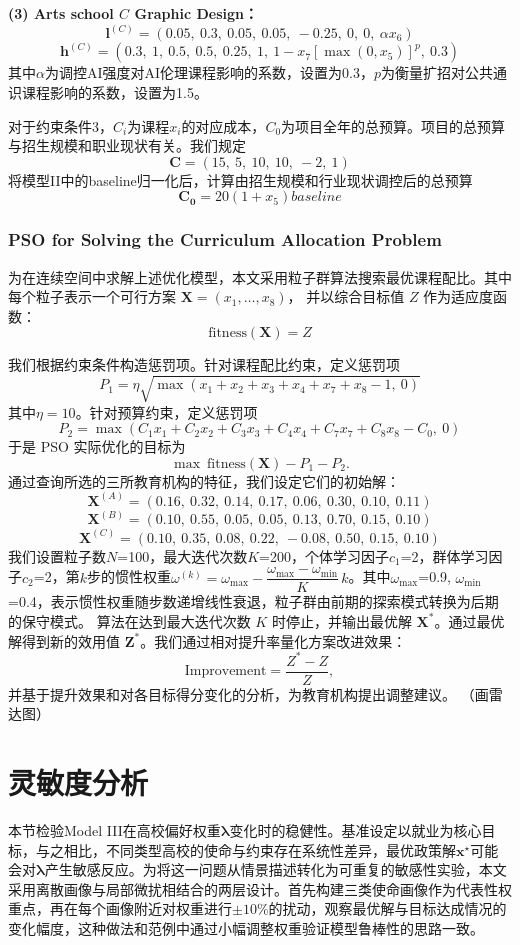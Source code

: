 \documentclass{mcmthesis}
\begin{document}
\medskip
\noindent\textbf{(3) Arts school $C$ Graphic Design：}
\[
\mathbf{l}^{(C)}=
(0.05,\ 0.3,\ 0.05,\ 0.05,\ -0.25,\ 0,\ 0,\ \alpha x_6)
\]
\[
\mathbf{h}^{(C)}=
(0.3,\ 1,\ 0.5,\ 0.5,\ 0.25,\ 1,\ 1-x_7[\max(0,x_5)]^{p},\ 0.3)
\]
其中$\alpha$为调控AI强度对AI伦理课程影响的系数，设置为0.3，$p$为衡量扩招对公共通识课程影响的系数，设置为1.5。

\noindent 对于约束条件3，$C_i$为课程$x_i$的对应成本，$C_0$为项目全年的总预算。项目的总预算与招生规模和职业现状有关。我们规定
\[
\mathbf{C}=
(15,\ 5,\ 10,\ 10,\ -2,\ 1)
\]
将模型II中的baseline归一化后，计算由招生规模和行业现状调控后的总预算
\[
\mathbf{C_0}=
20(1+x_5)baseline
\]

\subsubsection{PSO for Solving the Curriculum Allocation Problem}
\noindent 为在连续空间中求解上述优化模型，本文采用粒子群算法搜索最优课程配比。其中每个粒子表示一个可行方案
$\mathbf{X}=(x_1,\dots,x_8)$，
并以综合目标值 $Z$ 作为适应度函数：
\[
\mathrm{fitness}(\mathbf{X})=Z
\]

\noindent 我们根据约束条件构造惩罚项。针对课程配比约束，定义惩罚项
\[
P_1=\eta\sqrt{\max\!\left(x_1+x_2+x_3+x_4+x_7+x_8-1,\ 0\right)}
\]
其中$\eta=10$。针对预算约束，定义惩罚项
\[
P_2=\max\!\left(C_1x_1+C_2x_2+C_3x_3+C_4x_4+C_7x_7+C_8x_8-C_0,\ 0\right)
\]
于是 PSO 实际优化的目标为
\[
\max \ \mathrm{fitness}(\mathbf{X})-P_1-P_2.
\]
通过查询所选的三所教育机构的特征，我们设定它们的初始解：
\[
\mathbf{X}^{(A)}=
(0.16,\ 0.32,\ 0.14,\ 0.17,\ 0.06,\ 0.30,\ 0.10,\ 0.11)
\]
\[
\mathbf{X}^{(B)}=
(0.10,\ 0.55,\ 0.05,\ 0.05,\ 0.13,\ 0.70,\ 0.15,\ 0.10)
\]
\[
\mathbf{X}^{(C)}=
(0.10,\ 0.35,\ 0.08,\ 0.22,\ -0.08,\ 0.50,\ 0.15,\ 0.10)
\]
\noindent 我们设置粒子数$N$=100，最大迭代次数$K$=200，个体学习因子$c_1$=2，群体学习因子$c_2$=2，第$k$步的惯性权重$\omega^{(k)}=\omega_{\max}-\dfrac{\omega_{\max}-\omega_{\min}}{K}\,k$。其中$\omega_{\max}$=0.9, $\omega_{\min}$=0.4，表示惯性权重随步数递增线性衰退，粒子群由前期的探索模式转换为后期的保守模式。
算法在达到最大迭代次数 $K$ 时停止，并输出最优解 $\mathbf{X}^\ast$。通过最优解得到新的效用值 $\mathbf{Z}^\ast$。我们通过相对提升率量化方案改进效果：
\[
\mathrm{Improvement}=\frac{Z^\ast-Z}{Z},
\]
并基于提升效果和对各目标得分变化的分析，为教育机构提出调整建议。
（画雷达图）



\section{灵敏度分析}
\noindent 本节检验Model III在高校偏好权重$\boldsymbol{\lambda}$变化时的稳健性。基准设定以就业为核心目标，与之相比，不同类型高校的使命与约束存在系统性差异，最优政策解$\mathbf{x}^\star$可能会对$\boldsymbol{\lambda}$产生敏感反应。为将这一问题从情景描述转化为可重复的敏感性实验，本文采用离散画像与局部微扰相结合的两层设计。首先构建三类使命画像作为代表性权重点，再在每个画像附近对权重进行$\pm10\%$的扰动，观察最优解与目标达成情况的变化幅度，这种做法和范例中通过小幅调整权重验证模型鲁棒性的思路一致。
\end{document}
